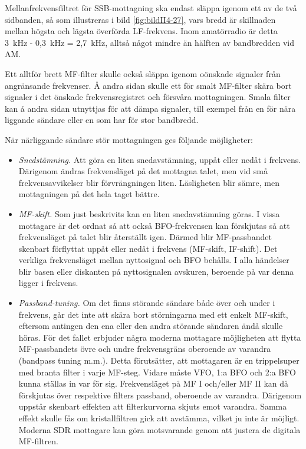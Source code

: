 
Mellanfrekvensfiltret för SSB-mottagning ska endast släppa igenom
ett av de två sidbanden, så som illustreras i bild \ref{fig:bildII4-27},
vars bredd är skillnaden mellan högsta och lägsta överförda LF-frekvens.
Inom amatörradio är detta 3~kHz - 0,3~kHz = 2,7~kHz, alltså något mindre än
hälften av bandbredden vid AM.

Ett alltför brett MF-filter skulle också släppa igenom oönskade
signaler från angränsande frekvenser.
Å andra sidan skulle ett för smalt MF-filter skära bort signaler i det
önskade frekvensregistret och försvåra mottagningen.
Smala filter kan å andra sidan utnyttjas för att dämpa signaler, till exempel från
en för nära liggande sändare eller en som har för stor bandbredd.

När närliggande sändare stör mottagningen ges följande möjligheter:
\begin{itemize}
\item \emph{Snedstämning.}
  Att göra en liten snedavstämning, uppåt eller nedåt i frekvens.
  Därigenom ändras frekvensläget på det mottagna talet, men vid små
  frekvensavvikelser blir förvrängningen liten.
  Läsligheten blir sämre, men mottagningen på det hela taget bättre.

\item \emph{MF-skift.}
  Som just beskrivits kan en liten snedavstämning göras.
  I vissa mottagare är det ordnat så att också BFO-frekvensen kan förskjutas
  så att frekvensläget på talet blir återställt igen.
  Därmed blir MF-passbandet skenbart förflyttat uppåt eller nedåt i frekvens
  (MF-skift, IF-shift).
  Det verkliga frekvensläget mellan nyttosignal och BFO behålls.
  I alla händelser blir basen eller diskanten på nyttosignalen avskuren,
  beroende på var denna ligger i frekvens.

\item \emph{Passband-tuning.}
  Om det finns störande sändare både över och under i frekvens, går det inte
  att skära bort störningarna med ett enkelt MF-skift, eftersom antingen den
  ena eller den andra störande sändaren ändå skulle höras.
  För det fallet erbjuder några moderna mottagare möjligheten att flytta
  MF-passbandets övre och undre frekvensgräns oberoende av varandra (bandpass
  tuning m.m.).
  Detta förutsätter, att mottagaren är en trippelsuper med branta filter i
  varje MF-steg.
  Vidare måste VFO, 1:a BFO och 2:a BFO kunna ställas in var för sig.
  Frekvensläget på MF I och/eller MF II kan då förskjutas över respektive
  filters passband, oberoende av varandra.
  Därigenom uppstår skenbart effekten att filterkurvorna skjuts emot varandra.
  Samma effekt skulle fås om kristallfiltren gick att avstämma, vilket ju inte
  är möjligt.
  Moderna SDR mottagare kan göra motsvarande genom att justera de digitala
  MF-filtren.
\end{itemize}


